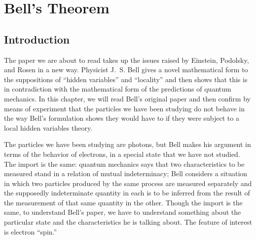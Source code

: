 \chapter{Bell's Theorem}



\renewcommand{\theequation}{\arabic{equation}}

\section*{Introduction}

The paper we are about to read takes up the issues raised by Einstein, Podolsky, and Rosen in a new way. Physicist J.~S. Bell gives a novel mathematical form to the suppositions of ``hidden variables'' and ``locality'' and then shows that this is in contradiction with the mathematical form of the predictions of quantum mechanics. In this chapter, we will read Bell’s original paper and then confirm by means of experiment that the particles we have been studying do not behave in the way Bell's formulation shows they would have to if they were subject to a local hidden variables theory.

The particles we have been studying are photons, but Bell makes his argument in terms of the behavior of electrons, in a special state that we have not studied. The import is the same: quantum mechanics says that two characteristics to be measured stand in a relation of mutual indeterminacy; Bell considers a situation in which two particles produced by the same process are measured separately and the supposedly indeterminate quantity in each is to be inferred from the result of the measurement of that same quantity in the other. Though the import is the same, to understand Bell’s paper, we have to understand something about the particular state and the characteristics he is talking about. The feature of interest is electron ``spin.''


